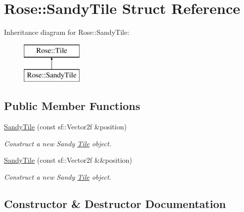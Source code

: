 \hypertarget{structRose_1_1SandyTile}{}\section{Rose\+::Sandy\+Tile Struct Reference}
\label{structRose_1_1SandyTile}
Inheritance diagram for Rose\+::Sandy\+Tile\+:\begin{figure}[H]
\begin{center}
\leavevmode
\includegraphics[height=2.000000cm]{structRose_1_1SandyTile}
\end{center}
\end{figure}
\subsection*{Public Member Functions}
\begin{DoxyCompactItemize}
\item 
\mbox{\hyperlink{structRose_1_1SandyTile_abe47dff8443bf253df6c723894ea17ca}{Sandy\+Tile}} (const sf\+::\+Vector2f \&position)
\begin{DoxyCompactList}\small\item\em Construct a new Sandy \mbox{\hyperlink{classRose_1_1Tile}{Tile}} object. \end{DoxyCompactList}\item 
\mbox{\hyperlink{structRose_1_1SandyTile_abf3581d4b2dbb27675ed3f1eab38324d}{Sandy\+Tile}} (const sf\+::\+Vector2f \&\&position)
\begin{DoxyCompactList}\small\item\em Construct a new Sandy \mbox{\hyperlink{classRose_1_1Tile}{Tile}} object. \end{DoxyCompactList}\end{DoxyCompactItemize}


\subsection{Constructor \& Destructor Documentation}
\mbox{\label{structRose_1_1SandyTile_abe47dff8443bf253df6c723894ea17ca}} 

